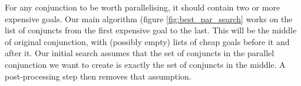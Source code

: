 For any conjunction to be worth parallelising,
it should contain two or more expensive goals.
Our main algorithm (figure \ref{fig:best_par_search} works on the list
of conjuncts
from the first expensive goal to the last.
This will be the middle of original conjunction,
with (possibly empty) lists of cheap goals before it and after it.
Our initial search assumes that
the set of conjuncts in the parallel conjunction we want to create
is exactly the set of conjuncts in the middle.
A post-processing step then removes that assumption.





